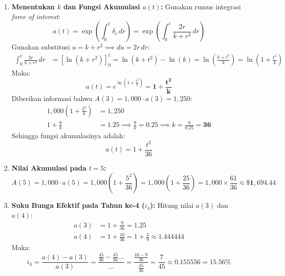 \documentclass[11pt,a4paper]{article}
\begin{document}
\begin{solutionbox}[Soal 7]
\begin{enumerate}[label=(\alph*)]
    \item \textbf{Menentukan $k$ dan Fungsi Akumulasi $a(t)$:}
    Gunakan rumus integrasi \textit{force of interest}:
    \begin{equation*}
        a(t) = \exp\left( \int_0^t \delta_r \, dr \right) = \exp\left( \int_0^t \frac{2r}{k + r^2} \, dr \right)
    \end{equation*}
    Gunakan substitusi $u = k + r^2 \implies du = 2r \, dr$:
    \begin{align*}
        \int_0^t \frac{2r}{k + r^2} \, dr &= \left[ \ln(k + r^2) \right]_0^t = \ln(k + t^2) - \ln(k) = \ln\left( \frac{k + t^2}{k} \right) = \ln\left( 1 + \frac{t^2}{k} \right)
    \end{align*}
    Maka:
    \begin{equation*}
        a(t) = e^{\ln\left(1 + \frac{t^2}{k}\right)} = \mathbf{1 + \frac{t^2}{k}}
    \end{equation*}
    Diberikan informasi bahwa $A(3) = 1{,}000 \cdot a(3) = 1{,}250$:
    \begin{align*}
        1{,}000 \left( 1 + \frac{3^2}{k} \right) &= 1{,}250 \\[0.3em]
        1 + \frac{9}{k} &= 1.25 \implies \frac{9}{k} = 0.25 \implies k = \frac{9}{0.25} = \mathbf{36}
    \end{align*}
    Sehingga fungsi akumulasinya adalah:
    \begin{equation*}
        a(t) = 1 + \frac{t^2}{36}
    \end{equation*}

    \item \textbf{Nilai Akumulasi pada $t = 5$:}
    \begin{equation*}
        A(5) = 1{,}000 \cdot a(5) = 1{,}000 \left( 1 + \frac{5^2}{36} \right) = 1{,}000 \left( 1 + \frac{25}{36} \right) = 1{,}000 \times \frac{61}{36} \approx \mathbf{\$1{,}694.44}
    \end{equation*}

    \item \textbf{Suku Bunga Efektif pada Tahun ke-4 ($i_4$):}
    Hitung nilai $a(3)$ dan $a(4)$:
    \begin{align*}
        a(3) &= 1 + \frac{9}{36} = 1.25 \\
        a(4) &= 1 + \frac{16}{36} = 1 + \frac{4}{9} \approx 1.444444
    \end{align*}
    Maka:
    \begin{equation*}
        i_4 = \frac{a(4) - a(3)}{a(3)} = \frac{\frac{45}{36} - \frac{45}{36} \text{...}}{\dots} = \frac{\frac{16-9}{36}}{\frac{45}{36}} = \frac{7}{45} \approx 0.155556 = \mathbf{15.56\%}
    \end{equation*}
\end{enumerate}
\end{solutionbox}
\end{document}
